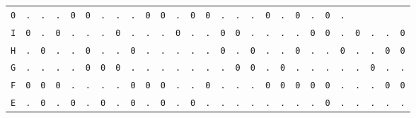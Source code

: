 \begin{figure}[H]
\begin{center}
{\begin{tabular}{c|cccccccccccccccccccccccccc}
				\texttt{0} & \texttt{.} & \texttt{.} & \texttt{.} &
				\texttt{0} & \texttt{0} & \texttt{.} & \texttt{.} &
				\texttt{.} & \texttt{0} & \texttt{0} & \texttt{.} &
				\texttt{0} & \texttt{0} & \texttt{.} & \texttt{.} &
				\texttt{.} & \texttt{0} & \texttt{.} & \texttt{0} &
				\texttt{.} & \texttt{0} & \texttt{.}                             \\
				\texttt{I} & \texttt{0} & \texttt{.} & \texttt{0} &
				\texttt{.} & \texttt{.} & \texttt{.} & \texttt{0} &
				\texttt{.} & \texttt{.} & \texttt{.} & \texttt{0} &
				\texttt{.} & \texttt{.} & \texttt{0} & \texttt{0} &
				\texttt{.} & \texttt{.} & \texttt{.} & \texttt{.} &
				\texttt{0} & \texttt{0} & \texttt{.} & \texttt{0} &
				\texttt{.} & \texttt{.} & \texttt{0}                             \\
				\texttt{H} & \texttt{.} & \texttt{0} & \texttt{.} &
				\texttt{.} & \texttt{0} & \texttt{.} & \texttt{.} &
				\texttt{0} & \texttt{.} & \texttt{.} & \texttt{.} &
				\texttt{.} & \texttt{.} & \texttt{0} & \texttt{.} &
				\texttt{0} & \texttt{.} & \texttt{.} & \texttt{0} &
				\texttt{.} & \texttt{.} & \texttt{0} & \texttt{.} &
				\texttt{.} & \texttt{0} & \texttt{0}                             \\
				\texttt{G} & \texttt{.} & \texttt{.} & \texttt{.} &
				\texttt{.} & \texttt{0} & \texttt{0} & \texttt{0} &
				\texttt{.} & \texttt{.} & \texttt{.} & \texttt{.} &
				\texttt{.} & \texttt{.} & \texttt{.} & \texttt{0} &
				\texttt{0} & \texttt{.} & \texttt{0} & \texttt{.} &
				\texttt{.} & \texttt{.} & \texttt{.} & \texttt{.} &
				\texttt{0} & \texttt{.} & \texttt{.}                             \\
				\texttt{F} & \texttt{0} & \texttt{0} & \texttt{0} &
				\texttt{.} & \texttt{.} & \texttt{.} & \texttt{.} &
				\texttt{0} & \texttt{0} & \texttt{0} & \texttt{.} &
				\texttt{.} & \texttt{0} & \texttt{.} & \texttt{.} &
				\texttt{.} & \texttt{0} & \texttt{0} & \texttt{0} &
				\texttt{0} & \texttt{0} & \texttt{.} & \texttt{.} &
				\texttt{.} & \texttt{0} & \texttt{0}                             \\
				\texttt{E} & \texttt{.} & \texttt{0} & \texttt{.} &
				\texttt{0} & \texttt{.} & \texttt{0} & \texttt{.} &
				\texttt{0} & \texttt{.} & \texttt{0} & \texttt{.} &
				\texttt{0} & \texttt{.} & \texttt{.} & \texttt{.} &
				\texttt{.} & \texttt{.} & \texttt{.} & \texttt{.} &
				\texttt{.} & \texttt{0} & \texttt{.} & \texttt{.} &
				\texttt{.} & \texttt{.} & \texttt{.}                             \\

\end{tabular}}
\end{center}
\end{figure}
